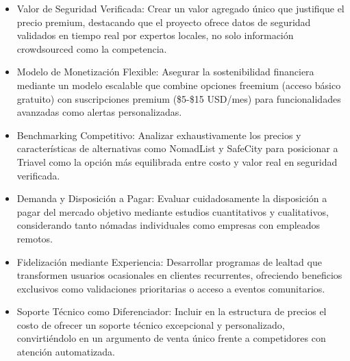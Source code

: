 \begin{itemize}
    \item Valor de Seguridad Verificada: Crear un valor agregado único que justifique el precio premium, destacando que el proyecto ofrece datos de seguridad validados en tiempo real por expertos locales, no solo información crowdsourced como la competencia.
    \item Modelo de Monetización Flexible: Asegurar la sostenibilidad financiera mediante un modelo escalable que combine opciones freemium (acceso básico gratuito) con suscripciones premium (\$5-\$15 USD/mes) para funcionalidades avanzadas como alertas personalizadas.
    \item Benchmarking Competitivo: Analizar exhaustivamente los precios y características de alternativas como NomadList y SafeCity para posicionar a Triavel como la opción más equilibrada entre costo y valor real en seguridad verificada.
    \item Demanda y Disposición a Pagar: Evaluar cuidadosamente la disposición a pagar del mercado objetivo mediante estudios cuantitativos y cualitativos, considerando tanto nómadas individuales como empresas con empleados remotos.
    \item Fidelización mediante Experiencia: Desarrollar programas de lealtad que transformen usuarios ocasionales en clientes recurrentes, ofreciendo beneficios exclusivos como validaciones prioritarias o acceso a eventos comunitarios.
    \item Soporte Técnico como Diferenciador: Incluir en la estructura de precios el costo de ofrecer un soporte técnico excepcional y personalizado, convirtiéndolo en un argumento de venta único frente a competidores con atención automatizada.
\end{itemize}

